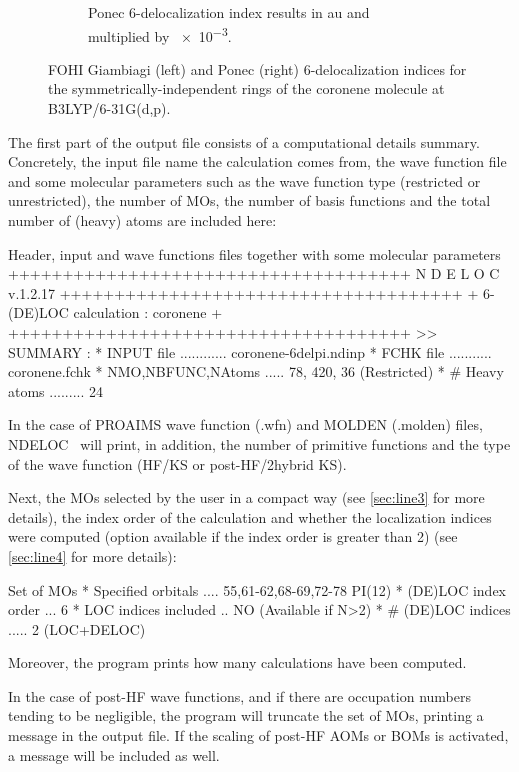 \documentclass[a4paper,11pt,openany]{memoir}
\newcommand\programa{\textsc{NDELOC}}
\begin{document}
\begin{center}
\begin{figure}
\begin{subfigure}[b]{0.4\textwidth}
			\caption{{\small Ponec 6-delocalization index results in au and multiplied by \num{e-3}.}}
			\label{fig:CoronenePonec}
		\end{subfigure}
		\caption{\ac{FOHI} Giambiagi (left) and Ponec (right) 6-delocalization indices for the symmetrically-independent rings of the coronene molecule at B3LYP/6-31G(d,p).}\label{fig:Coronene6Dec}
	\end{figure}
\end{center}

The first part of the output file consists of a computational details summary. Concretely, the input file name the calculation comes from, the wave function file and some molecular parameters such as the wave function type (restricted or unrestricted), the number of \acp{MO}, the number of basis functions and the total number of (heavy) atoms are included here:
\begin{recuadro}{Header, input and wave functions files together with some molecular parameters}
+++++++++++++++++++++++++++++++++++++
        N D E L O C  v.1.2.17
+++++++++++++++++++++++++++++++++++++
+ 6-(DE)LOC calculation :  coronene +
+++++++++++++++++++++++++++++++++++++
>> SUMMARY :
* INPUT file ............ coronene-6delpi.ndinp
* FCHK   file ........... coronene.fchk
* NMO,NBFUNC,NAtoms ..... 78, 420, 36 (Restricted)
* # Heavy atoms ......... 24
\end{recuadro}
In the case of PROAIMS wave function (.wfn) and MOLDEN (.molden) files, \programa~ will print, in addition, the number of primitive functions and the type of the wave function (HF/KS or post-HF/2hybrid KS).

Next, the \acp{MO} selected by the user in a compact way (see \autoref{sec:line3} for more details), the index order of the calculation and whether the localization indices were computed (option available if the index order is greater than 2) (see \autoref{sec:line4} for more details):
\begin{recuadro}{Set of \acp{MO}}
* Specified orbitals .... 55,61-62,68-69,72-78 PI(12)
* (DE)LOC index order ... 6
* LOC indices included .. NO (Available if N>2)
* # (DE)LOC indices ..... 2 (LOC+DELOC)
\end{recuadro}
Moreover, the program prints how many calculations have been computed.

In the case of post-HF wave functions, and if there are occupation numbers  tending to be negligible, the program will truncate the set of \acp{MO}, printing a message in the output file. If the scaling of post-HF \acp{AOM} or \acp{BOM} is activated, a message will be included as well.
\end{document}
